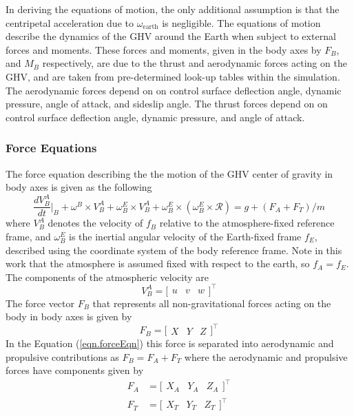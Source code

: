 In deriving the equations of motion, the only additional assumption is that the centripetal acceleration due to $\omega_{\text{earth}}$ is negligible.
The equations of motion describe the dynamics of the GHV around the Earth when subject to external forces and moments.
These forces and moments, given in the body axes by $F_{B}$, and $M_{B}$ respectively, are due to the thrust and aerodynamic forces acting on the GHV, and are taken from pre-determined look-up tables within the simulation.
The aerodynamic forces depend on on control surface deflection angle, dynamic pressure, angle of attack, and sideslip angle.
The thrust forces depend on on control surface deflection angle, dynamic pressure, and angle of attack.

\subsubsection{Force Equations}

The force equation describing the the motion of the GHV center of gravity in body axes is given as the following
\begin{equation}
  \label{eqn.forceEqn}
  \frac{dV^{A}_{B}}{dt}\biggr|_{B}+\omega^{B}\times V^{A}_{B}+
  \omega^{E}_{B}\times V^{A}_{B}+\omega^{E}_{B}\times(\omega^{E}_{B}\times\mathscr{R})
  =
  g+(F_{A}+F_{T})/m
\end{equation}
where $V^{A}_{B}$ denotes the velocity of $f_{B}$ relative to the atmosphere-fixed reference frame, and $\omega^{E}_{B}$ is the inertial angular velocity of the Earth-fixed frame $f_{E}$, described using the coordinate system of the body reference frame.
Note in this work that the atmosphere is assumed fixed with respect to the earth, so $f_{A}=f_{E}$.
The components of the atmospheric velocity are
\begin{equation*}
  V_{B}^{A}=
  \bigr[
  \begin{array}{ccc}
    u & v & w
  \end{array}\bigr]^{\top}
\end{equation*}
The force vector $F_{B}$ that represents all non-gravitational forces acting on the body in body axes is given by
\begin{equation*}
  F_{B}=
  \bigr[
  \begin{array}{ccc}
    X & Y & Z
  \end{array}\bigr]^{\top}
\end{equation*}
In the Equation (\ref{eqn.forceEqn}) this force is separated into aerodynamic and propulsive contributions as $F_{B}=F_{A}+F_{T}$ where the aerodynamic and propulsive forces have components given by
\begin{equation}
  \label{eqn.AeroAndPropulsiveForces}
  \begin{split}
    F_{A}&=
    \bigr[
    \begin{array}{ccc}
      X_{A} & Y_{A} & Z_{A}
    \end{array}\bigr]^{\top} \\
    F_{T}&=
    \bigr[
    \begin{array}{ccc}
      X_{T} & Y_{T} & Z_{T}
    \end{array}\bigr]^{\top}
  \end{split}
\end{equation}

